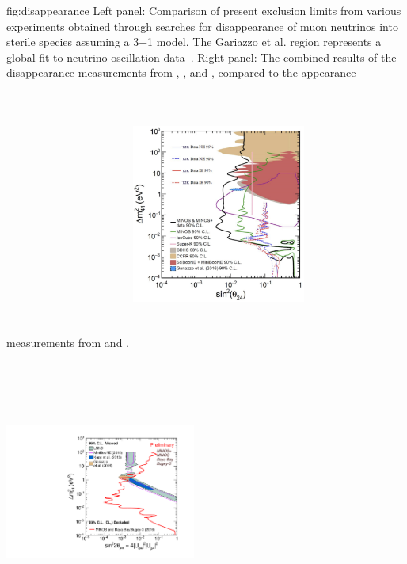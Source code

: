 \begin{dunefigure}{fig:disappearance}
{Left panel: Comparison of present exclusion limits from various experiments obtained through searches for disappearance of muon neutrinos into sterile species assuming a 3+1 model.  The Gariazzo et al. region represents a global fit to neutrino oscillation data~\cite{Gariazzo_2015}. 
    Right panel: The combined results of the disappearance measurements from , , and , compared to the appearance measurements from  and \miniboone.}
    \includegraphics[height=3.5in,width=0.43\textwidth]{graphics/disappearance}
    \includegraphics[height=3.7in,width=0.47\textwidth]{graphics/ComboLimit99_prelim.pdf}
\end{dunefigure}


